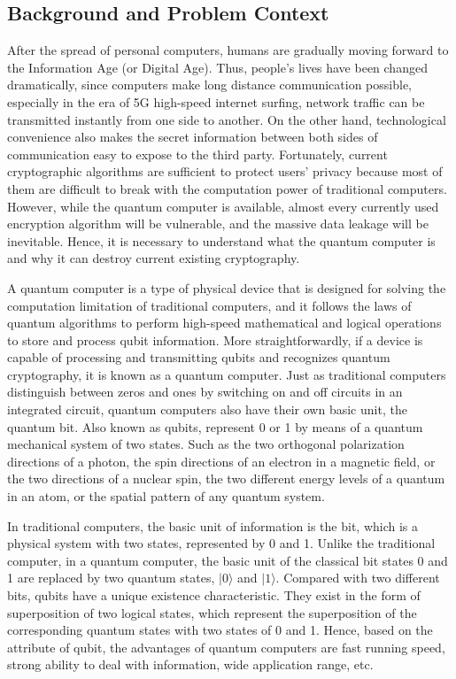 \documentclass[sigconf]{acmart}
\begin{document}
\subsection{Background and Problem Context}
After the spread of personal computers, humans are gradually moving forward to the Information Age (or Digital Age). 
Thus, people’s lives have been changed dramatically, since computers make long distance communication possible, especially in the era of 5G high-speed internet surfing, network traffic can be transmitted instantly from one side to another. 
On the other hand, technological convenience also makes the secret information between both sides of communication easy to expose to the third party. 
Fortunately, current cryptographic algorithms are sufficient to protect users’ privacy because most of them are difficult to break with the computation power of traditional computers. 
However, while the quantum computer is available, almost every currently used encryption algorithm will be vulnerable, and the massive data leakage will be inevitable. 
Hence, it is necessary to understand what the quantum computer is and why it can destroy current existing cryptography.


A quantum computer is a type of physical device that is designed for solving the computation limitation of traditional computers, and it follows the laws of quantum algorithms to perform  high-speed mathematical and logical operations to store and process qubit information. More straightforwardly, if a device is capable of processing and transmitting qubits and recognizes quantum cryptography, it is known as a quantum computer\cite{sciencedirect}. Just as traditional computers distinguish between zeros and ones by switching on and off circuits in an integrated circuit, quantum computers also have their own basic unit, the quantum bit. Also known as qubits, represent 0 or 1 by means of a quantum mechanical system of two states. Such as the two orthogonal polarization directions of a photon, the spin directions of an electron in a magnetic field, or the two directions of a nuclear spin, the two different energy levels of a quantum in an atom, or the spatial pattern of any quantum system.

In traditional computers, the basic unit of information is the bit, which is a physical system with two states, represented by 0 and 1. Unlike the traditional computer, in a quantum computer, the basic unit of the classical bit states 0 and 1 are replaced by two quantum states, $\rvert 0\rangle$ and $\rvert 1\rangle$. Compared with two different bits, qubits have a unique existence characteristic. They exist in the form of superposition of two logical states, which represent the superposition of the corresponding quantum states with two states of 0 and 1. Hence, based on the attribute of qubit, the advantages of quantum computers are fast running speed, strong ability to deal with information, wide application range, etc.
\end{document}
